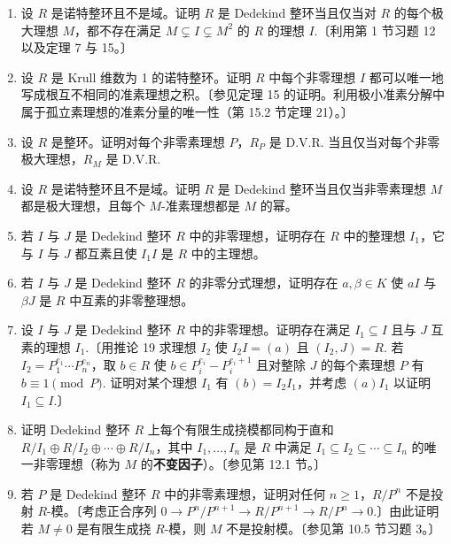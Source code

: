 \begin{enumerate}
\item 设 \(R\) 是诺特整环且不是域。证明 \(R\) 是 Dedekind 整环当且仅当对 \(R\) 的每个极大理想 \(M\)，都不存在满足 \(M \subsetneq I \subsetneq M^2\) 的 \(R\) 的理想 \(I\).〔利用第 1 节习题 12 以及定理 7 与 15。〕

\item 设 \(R\) 是 Krull 维数为 1 的诺特整环。证明 \(R\) 中每个非零理想 \(I\) 都可以唯一地写成根互不相同的准素理想之积。〔参见定理 15 的证明。利用极小准素分解中属于孤立素理想的准素分量的唯一性（第 15.2 节定理 21）。〕

\item 设 \(R\) 是整环。证明对每个非零素理想 \(P\)，\(R_P\) 是 D.V.R. 当且仅当对每个非零极大理想，\(R_M\) 是 D.V.R.

\item 设 \(R\) 是诺特整环且不是域。证明 \(R\) 是 Dedekind 整环当且仅当非零素理想 \(M\) 都是极大理想，且每个 \(M\)-准素理想都是 \(M\) 的幂。

\item 若 \(I\) 与 \(J\) 是 Dedekind 整环 \(R\) 中的非零理想，证明存在 \(R\) 中的整理想 \(I_1\)，它与 \(I\) 与 \(J\) 都互素且使 \(I_1I\) 是 \(R\) 中的主理想。

\item 若 \(I\) 与 \(J\) 是 Dedekind 整环 \(R\) 的非零分式理想，证明存在 \(a, \beta \in K\) 使 \(aI\) 与 \(\beta J\) 是 \(R\) 中互素的非零整理想。

\item 设 \(I\) 与 \(J\) 是 Dedekind 整环 \(R\) 中的非零理想。证明存在满足 \(I_1 \subseteq I\) 且与 \(J\) 互素的理想 \(I_1\).〔用推论 19 求理想 \(I_2\) 使 \(I_2I = (a)\) 且 \((I_2, J) = R\). 若 \(I_2 = P_1^{e_1}\cdots P_n^{e_n}\)，取 \(b \in R\) 使 \(b \in P_i^{e_i}-P_i^{e_i+1}\) 且对整除 \(J\) 的每个素理想 \(P\) 有 \(b \equiv 1 \pmod P\). 证明对某个理想 \(I_1\) 有 \((b) = I_2I_1\)，并考虑 \((a)I_1\) 以证明 \(I_1 \subseteq I\).〕

\item 证明 Dedekind 整环 \(R\) 上每个有限生成挠模都同构于直和 \(R/I_1 \oplus R/I_2 \oplus \cdots \oplus R/I_n\)，其中 \(I_1, \ldots, I_n\) 是 \(R\) 中满足 \(I_1 \subseteq I_2 \subseteq \cdots \subseteq I_n\) 的唯一非零理想（称为 \(M\) 的\textbf{不变因子}）。〔参见第 12.1 节。〕

\item 若 \(P\) 是 Dedekind 整环 \(R\) 中的非零素理想，证明对任何 \(n \geq 1\)，\(R/P^n\) 不是投射 \(R\)-模。〔考虑正合序列 \(0 \to P^n/P^{n+1} \to R/P^{n+1} \to R/P^n \to 0\).〕由此证明若 \(M \neq 0\) 是有限生成挠 \(R\)-模，则 \(M\) 不是投射模。〔参见第 10.5 节习题 3。〕


\end{enumerate}
